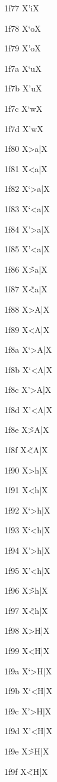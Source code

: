 \documentclass[11pt]{article}
\begin{document}
1f77 X{\textgreek{'i}}X

1f78 X{\textgreek{`o}}X

1f79 X{\textgreek{'o}}X

1f7a X{\textgreek{`u}}X

1f7b X{\textgreek{'u}}X

1f7c X{\textgreek{`w}}X

1f7d X{\textgreek{'w}}X

1f80 X{\textgreek{>a|}}X

1f81 X{\textgreek{<a|}}X

1f82 X{\textgreek{`>a|}}X

1f83 X{\textgreek{`<a|}}X

1f84 X{\textgreek{'>a|}}X

1f85 X{\textgreek{'<a|}}X

1f86 X{\textgreek{\~{>a}|}}X

1f87 X{\textgreek{\~{<a}|}}X

1f88 X{\textgreek{>A|}}X

1f89 X{\textgreek{<A|}}X

1f8a X{\textgreek{`>A|}}X

1f8b X{\textgreek{`<A|}}X

1f8c X{\textgreek{'>A|}}X

1f8d X{\textgreek{'<A|}}X

1f8e X{\textgreek{\~{>A}|}}X

1f8f X{\textgreek{\~{<A}|}}X

1f90 X{\textgreek{>h|}}X

1f91 X{\textgreek{<h|}}X

1f92 X{\textgreek{`>h|}}X

1f93 X{\textgreek{`<h|}}X

1f94 X{\textgreek{'>h|}}X

1f95 X{\textgreek{'<h|}}X

1f96 X{\textgreek{\~{>h}|}}X

1f97 X{\textgreek{\~{<h}|}}X

1f98 X{\textgreek{>H|}}X

1f99 X{\textgreek{<H|}}X

1f9a X{\textgreek{`>H|}}X

1f9b X{\textgreek{`<H|}}X

1f9c X{\textgreek{'>H|}}X

1f9d X{\textgreek{'<H|}}X

1f9e X{\textgreek{\~{>H}|}}X

1f9f X{\textgreek{\~{<H}|}}X
\end{document}
